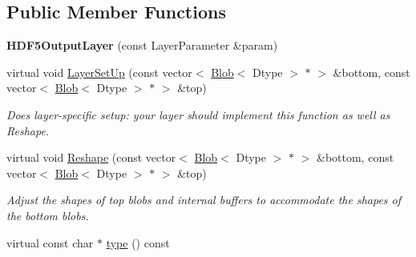 \subsection*{Public Member Functions}
\begin{DoxyCompactItemize}
\item 
{\bfseries H\+D\+F5\+Output\+Layer} (const Layer\+Parameter \&param)\hypertarget{classcaffe_1_1HDF5OutputLayer_acf9e02d15a72cb6838e8fd2860e046b5}{}\label{classcaffe_1_1HDF5OutputLayer_acf9e02d15a72cb6838e8fd2860e046b5}

\item 
virtual void \hyperlink{classcaffe_1_1HDF5OutputLayer_a50777ff487cdca409c912af31d36b499}{Layer\+Set\+Up} (const vector$<$ \hyperlink{classcaffe_1_1Blob}{Blob}$<$ Dtype $>$ $\ast$ $>$ \&bottom, const vector$<$ \hyperlink{classcaffe_1_1Blob}{Blob}$<$ Dtype $>$ $\ast$ $>$ \&top)
\begin{DoxyCompactList}\small\item\em Does layer-\/specific setup\+: your layer should implement this function as well as Reshape. \end{DoxyCompactList}\item 
virtual void \hyperlink{classcaffe_1_1HDF5OutputLayer_ad0478aa253430dfc405336f98264f8c5}{Reshape} (const vector$<$ \hyperlink{classcaffe_1_1Blob}{Blob}$<$ Dtype $>$ $\ast$ $>$ \&bottom, const vector$<$ \hyperlink{classcaffe_1_1Blob}{Blob}$<$ Dtype $>$ $\ast$ $>$ \&top)
\begin{DoxyCompactList}\small\item\em Adjust the shapes of top blobs and internal buffers to accommodate the shapes of the bottom blobs. \end{DoxyCompactList}\item 
virtual const char $\ast$ \hyperlink{classcaffe_1_1HDF5OutputLayer_a01427fa792250df062b97460175cadfb}{type} () const \hypertarget{classcaffe_1_1HDF5OutputLayer_a01427fa792250df062b97460175cadfb}{}\label{classcaffe_1_1HDF5OutputLayer_a01427fa792250df062b97460175cadfb}


\end{DoxyCompactItemize}
